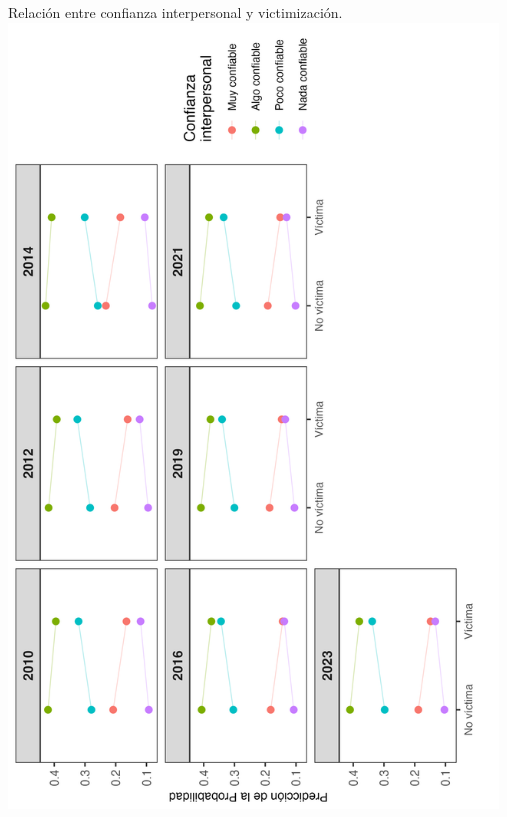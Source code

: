 \documentclass[letterpaper]{article}
\begin{document}
\begin{center}
Relación entre confianza interpersonal y victimización.
\includegraphics[width = 13cm]{plot_peer_03.png}
    \label{tab:plot5}
\end{center}

\newpage
\end{document}
